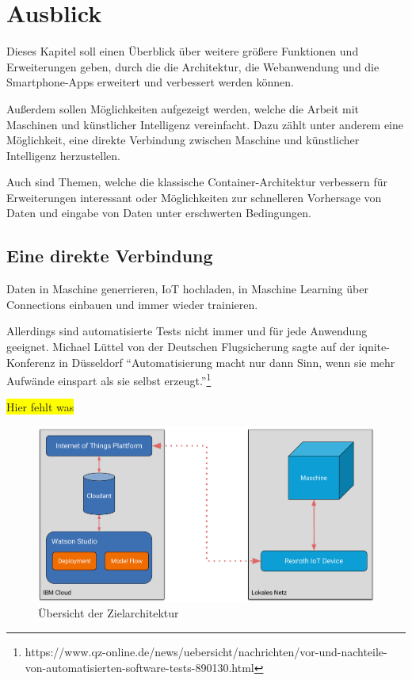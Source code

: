 \chapter{Ausblick}
\label{ch:ausblick}
Dieses Kapitel soll einen Überblick über weitere größere Funktionen und Erweiterungen geben, durch die die Architektur,
die Webanwendung und die Smartphone-Apps erweitert und verbessert werden können.

Außerdem sollen Möglichkeiten aufgezeigt werden, welche die Arbeit mit Maschinen und künstlicher Intelligenz
vereinfacht. Dazu zählt unter anderem eine Möglichkeit, eine direkte Verbindung zwischen Maschine und künstlicher
Intelligenz herzustellen.

Auch sind Themen, welche die klassische Container-Architektur verbessern für Erweiterungen interessant oder
Möglichkeiten zur schnelleren Vorhersage von Daten und eingabe von Daten unter erschwerten Bedingungen.

\section{Eine direkte Verbindung}
Daten in Maschine generrieren, IoT hochladen, in Maschine Learning über Connections einbauen und immer wieder
trainieren.

Allerdings sind automatisierte Tests nicht immer und für jede Anwendung geeignet. Michael Lüttel von der Deutschen 
Flugsicherung sagte auf der iqnite-Konferenz in Düsseldorf \enquote{Automatisierung macht nur dann Sinn, wenn sie mehr 
Aufwände einspart als sie selbst erzeugt.}\footnote{https://www.qz-online.de/news/uebersicht/nachrichten/vor-und-nachteile-von-automatisierten-software-tests-890130.html}

\colorbox{yellow}{Hier fehlt was}

\begin{figure}[h]
    \centering
    \includegraphics[width=\textwidth]{images/kapitel_6/architektur_uebersicht.pdf}
    \caption{Übersicht der Zielarchitektur}
    \label{fig:ausblick_uebersicht}
\end{figure}

